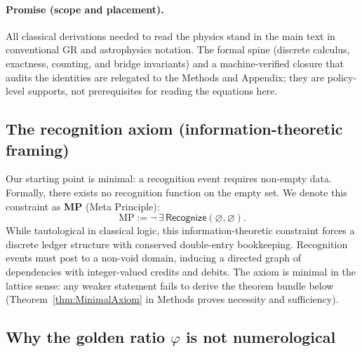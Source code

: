 \documentclass[11pt]{article}
\begin{document}
\paragraph{Promise (scope and placement).}
All classical derivations needed to read the physics stand in the main text in conventional GR and astrophysics notation. The formal spine (discrete calculus, exactness, counting, and bridge invariants) and a machine-verified closure that audits the identities are relegated to the Methods and Appendix; they are policy-level supports, not prerequisites for reading the equations here.

\subsection*{The recognition axiom (information-theoretic framing)}

Our starting point is minimal: a recognition event requires non-empty data. Formally, there exists no recognition function on the empty set. We denote this constraint as \textbf{MP} (Meta Principle):
\[
\text{MP} := \neg\,\exists\,\mathsf{Recognize}(\varnothing,\varnothing).
\]
While tautological in classical logic, this information-theoretic constraint forces a discrete ledger structure with conserved double-entry bookkeeping. Recognition events must post to a non-void domain, inducing a directed graph of dependencies with integer-valued credits and debits. The axiom is minimal in the lattice sense: any weaker statement fails to derive the theorem bundle below (Theorem~\ref{thm:MinimalAxiom} in Methods proves necessity and sufficiency).

\subsection*{Why the golden ratio $\varphi$ is not numerological}
\end{document}
